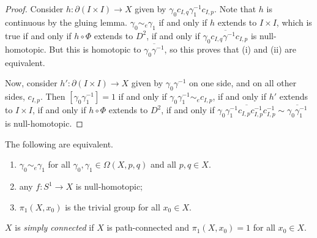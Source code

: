 \begin{proof}
	Consider \( h \colon \partial (I \times I) \to X \) given by \( \gamma_0 c_{I,q} \gamma_1^{-1} c_{I,p} \).
	Note that \( h \) is continuous by the gluing lemma.
	\( \gamma_0 \sim_e \gamma_1 \) if and only if \( h \) extends to \( I \times I \), which is true if and only if \( h \circ \Phi \) extends to \( D^2 \), if and only if \( \overline{\gamma_0 c_{I,q} \gamma^{-1} c_{I,p}} \) is null-homotopic.
	But this is homotopic to \( \overline{\gamma_0\gamma^{-1}} \), so this proves that (i) and (ii) are equivalent.

	Now, consider \( h' \colon \partial (I \times I) \to X \) given by \( \gamma_0 \gamma^{-1} \) on one side, and on all other sides, \( c_{I,p} \).
	Then \( [\gamma_0\gamma_1^{-1}] = 1 \) if and only if \( \gamma_0 \gamma_1^{-1} \sim_e c_{I,p} \), if and only if \( h' \) extends to \( I \times I \), if and only if \( h \circ \Phi \) extends to \( D^2 \), if and only if \( \overline{\gamma_0\gamma_1^{-1} c_{I,p} c_{I,p}^{-1} c_{I,p}^{-1}} \sim \overline{\gamma_0\gamma_1^{-1}} \) is null-homotopic.
\end{proof}
\begin{corollary}
	The following are equivalent.
	\begin{enumerate}
		\item \( \gamma_0 \sim_e \gamma_1 \) for all \( \gamma_0, \gamma_1 \in \Omega(X,p,q) \) and all \( p,q \in X \).
		\item any \( f \colon S^1 \to X \) is null-homotopic;

		\item \( \pi_1(X,x_0) \) is the trivial group for all \( x_0 \in X \).
	\end{enumerate}
\end{corollary}
\begin{definition}
	\( X \) is \emph{simply connected} if \( X \) is path-connected and \( \pi_1(X,x_0) = 1 \) for all \( x_0 \in X \).
\end{definition}


